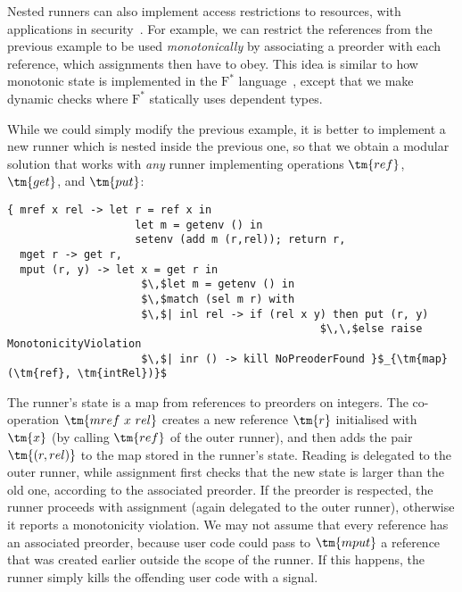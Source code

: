 \begin{example}
%
Nested runners can also implement access restrictions to resources,
with applications in security~\cite{DelignatLavaud:TLS}. For example, we can restrict
the references from the previous example to be used \emph{monotonically} by associating
a preorder with each reference, which assignments then have to obey.
This idea is similar to how monotonic state is implemented in the $\mathrm{F}^{*}$
language~\cite{Ahman:RecallingAWitness}, except that we make dynamic checks where
$\mathrm{F}^{*}$ statically uses dependent types.

While we could simply modify the previous example, it is better to implement a new runner which
is nested inside the previous one, so that we obtain a modular solution that works with
\emph{any} runner implementing operations $\tm{ref}$, $\tm{get}$, and $\tm{put}$:
%
\begin{lstlisting}
{ mref x rel -> let r = ref x in
                    let m = getenv () in
                    setenv (add m (r,rel)); return r,
  mget r -> get r,
  mput (r, y) -> let x = get r in
                     $\,$let m = getenv () in
                     $\,$match (sel m r) with
                     $\,$| inl rel -> if (rel x y) then put (r, y)
                                                 $\,\,$else raise MonotonicityViolation
                     $\,$| inr () -> kill NoPreoderFound }$_{\tm{map} (\tm{ref}, \tm{intRel})}$
\end{lstlisting}
%
The runner's state is a map from references to preorders on integers. The co-operation $\tm{mref~x~rel}$ creates a new
reference $\tm{r}$ initialised with~$\tm{x}$ (by calling $\tm{ref}$ of the outer runner), and 
then adds the pair $\tm{(r,rel)}$ to the map stored in the runner's state. Reading is delegated to the outer runner, while assignment 
first checks that the new state is larger than the old one, according to the associated preorder. If the
preorder is respected, the runner proceeds with assignment (again delegated to the outer runner), otherwise it reports a
monotonicity violation. We may not assume that every reference has an associated preorder,
because user code could pass to $\tm{mput}$ a reference that was created earlier outside 
the scope of the runner. If this happens, the runner simply kills the offending user code with
a signal.
\end{example}

